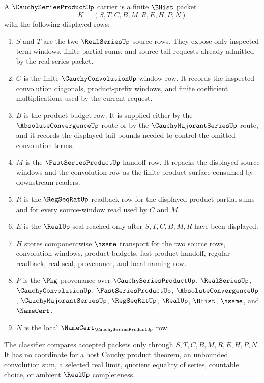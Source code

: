\begin{definition}
\label{def:cauchy-series-product-carrier}
A $\CauchySeriesProductUp$ carrier is a finite $\BHist$ packet
$$
K=(S,T,C,B,M,R,E,H,P,N)
$$
with the following displayed rows:
\begin{enumerate}
\item $S$ and $T$ are the two $\RealSeriesUp$ source rows. They expose only inspected term windows, finite partial sums, and source tail requests already admitted by the real-series packet.
\item $C$ is the finite $\CauchyConvolutionUp$ window row. It records the inspected convolution diagonals, product-prefix windows, and finite coefficient multiplications used by the current request.
\item $B$ is the product-budget row. It is supplied either by the $\AbsoluteConvergenceUp$ route or by the $\CauchyMajorantSeriesUp$ route, and it records the displayed tail bounds needed to control the omitted convolution terms.
\item $M$ is the $\FastSeriesProductUp$ handoff row. It repacks the displayed source windows and the convolution row as the finite product surface consumed by downstream readers.
\item $R$ is the $\RegSeqRatUp$ readback row for the displayed product partial sums and for every source-window read used by $C$ and $M$.
\item $E$ is the $\RealUp$ seal reached only after $S,T,C,B,M,R$ have been displayed.
\item $H$ stores componentwise $\hsame$ transport for the two source rows, convolution windows, product budgets, fast-product handoff, regular readback, real seal, provenance, and local naming row.
\item $P$ is the $\Pkg$ provenance over $\CauchySeriesProductUp$, $\RealSeriesUp$, $\CauchyConvolutionUp$, $\FastSeriesProductUp$, $\AbsoluteConvergenceUp$, $\CauchyMajorantSeriesUp$, $\RegSeqRatUp$, $\RealUp$, $\BHist$, $\hsame$, and $\NameCert$.
\item $N$ is the local $\NameCert_{\CauchySeriesProductUp}$ row.
\end{enumerate}
The classifier compares accepted packets only through $S,T,C,B,M,R,E,H,P,N$. It has no coordinate for a host Cauchy product theorem, an unbounded convolution sum, a selected real limit, quotient equality of series, countable choice, or ambient $\RealUp$ completeness.
\end{definition}

